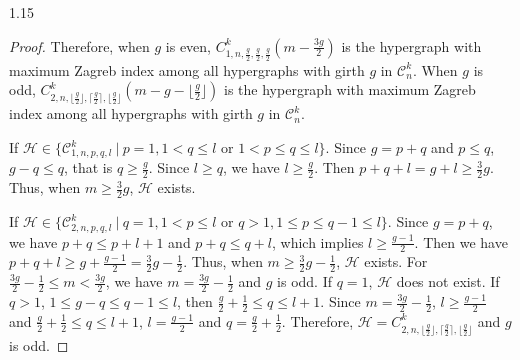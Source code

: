 \documentclass[preprint,12pt]{elsarticle1}
\numberwithin{equation}{section}
\begin{document}
\begin{spacing}{1.15}
\begin{proof}


Therefore,
when $g$ is even, $C_{1,n,\frac{g}{2},\frac{g}{2},\frac{g}{2}}^{k}(m-\frac{3g}{2})$ is the hypergraph with maximum Zagreb index among all hypergraphs with girth $g$ in $\mathcal{C}_{n}^{k}$.
When $g$ is odd, $C_{2,n,\lfloor\frac{g}{2}\rfloor,\lceil\frac{g}{2}\rceil,\lfloor\frac{g}{2}\rfloor}^{k}(m-g-\lfloor\frac{g}{2}\rfloor)$ is the hypergraph with maximum Zagreb index among all hypergraphs with girth $g$ in $\mathcal{C}_{n}^{k}$.



If $\mathcal{H} \in \{\mathcal{C}_{1,n,p,q,l}^{k} ~|~ p=1,1<q\leq l \text{~or~} 1<p\leq q\leq l\}$.
Since $g=p+q$ and $p \leq q$, $g-q \leq q$, that is $q\geq \frac{g}{2}$. Since $l\geq q$, we have $l\geq \frac{g}{2}$.
Then $p+q+l=g+l\geq \frac{3}{2}g$. Thus,
when $m\geq \frac{3}{2}g$, $\mathcal{H}$ exists.

If $\mathcal{H} \in  \{\mathcal{C}_{2,n,p,q,l}^{k}~|~ q=1,1<p\leq l \text{~or~} q>1, 1\leq p\leq q-1\leq l\}$.
Since $g=p+q$,
we have $p+q\leq p+l+1$ and $p+q\leq q+l$,
which implies $l\geq \frac{g-1}{2}$.
Then we have $p+q+l\geq g+\frac{g-1}{2}=\frac{3}{2}g-\frac{1}{2}$.
Thus, when
$m\geq \frac{3}{2}g-\frac{1}{2}$, $\mathcal{H}$ exists.
For $\frac{3g}{2}-\frac{1}{2}\leq m<\frac{3g}{2}$, we have $m=\frac{3g}{2}-\frac{1}{2}$ and $g$ is odd.
If $q=1$, $\mathcal{H}$ does not exist.
If $q>1$, $1\leq g-q\leq q-1\leq l$, then $\frac{g}{2}+\frac{1}{2}\leq q\leq l+1.$  Since $m=\frac{3g}{2}-\frac{1}{2}$, $l\geq \frac{g-1}{2}$ and $\frac{g}{2}+\frac{1}{2}\leq q\leq l+1$, $l=\frac{g-1}{2}$ and $q=\frac{g}{2}+\frac{1}{2}$.
Therefore, $\mathcal{H}=C_{2,n,\lfloor\frac{g}{2}\rfloor,\lceil\frac{g}{2}\rceil,\lfloor\frac{g}{2}\rfloor}^{k}$ and $g$ is odd. %


\end{proof}
\end{spacing}
\end{document}
